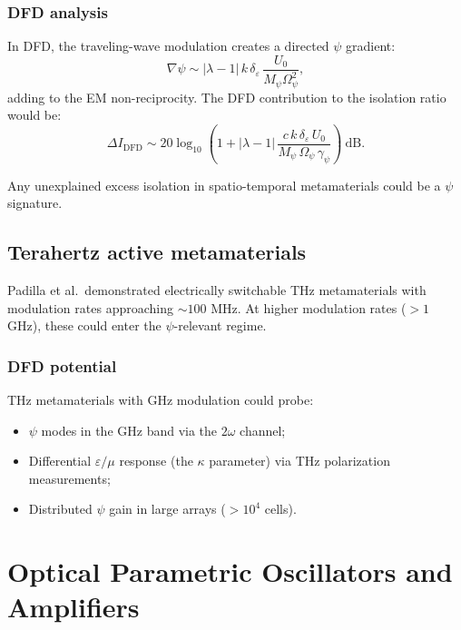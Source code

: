 \documentclass[12pt,letterpaper]{article}
\begin{document}
\subsubsection{DFD analysis}

In DFD, the traveling-wave modulation creates a directed $\psi$
gradient:
\begin{equation}
  \nabla\psi \sim |\lambda - 1|\,k\,\delta_\varepsilon\,
    \frac{U_0}{M_\psi\Omega_\psi^2},
\end{equation}
adding to the EM non-reciprocity.  The DFD contribution to the
isolation ratio would be:
\begin{equation}
  \Delta I_{\text{DFD}} \sim 20\log_{10}\!\left(
    1 + |\lambda - 1|\,\frac{c\,k\,\delta_\varepsilon\,U_0}
    {M_\psi\,\Omega_\psi\,\gamma_\psi}
  \right)~\text{dB}.
\end{equation}

Any unexplained excess isolation in spatio-temporal metamaterials
could be a $\psi$ signature.

\subsection{Terahertz active metamaterials}

Padilla et al.\ demonstrated electrically switchable THz metamaterials
with modulation rates approaching $\sim 100$ MHz.  At higher modulation
rates ($> 1$ GHz), these could enter the $\psi$-relevant regime.

\subsubsection{DFD potential}

THz metamaterials with GHz modulation could probe:
\begin{itemize}[noitemsep]
  \item $\psi$ modes in the GHz band via the $2\omega$ channel;
  \item Differential $\varepsilon/\mu$ response (the $\kappa$ parameter)
    via THz polarization measurements;
  \item Distributed $\psi$ gain in large arrays ($> 10^4$ cells).
\end{itemize}

\section{Optical Parametric Oscillators and Amplifiers}
\end{document}
